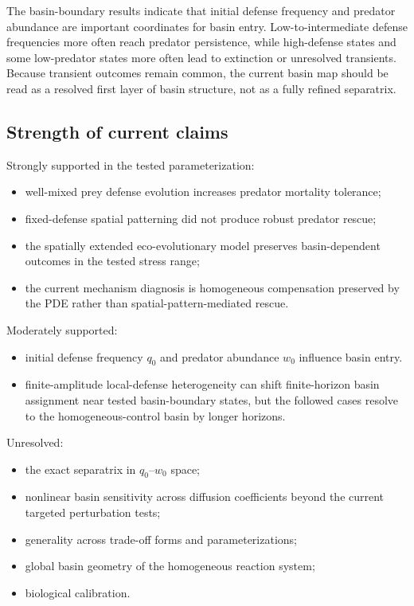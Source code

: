 \documentclass[11pt]{article}
\begin{document}
The basin-boundary results indicate that initial defense frequency and predator abundance are important coordinates for basin entry. Low-to-intermediate defense frequencies more often reach predator persistence, while high-defense states and some low-predator states more often lead to extinction or unresolved transients. Because transient outcomes remain common, the current basin map should be read as a resolved first layer of basin structure, not as a fully refined separatrix.

\subsection{Strength of current claims}

Strongly supported in the tested parameterization:
\begin{itemize}
  \item well-mixed prey defense evolution increases predator mortality tolerance;
  \item fixed-defense spatial patterning did not produce robust predator rescue;
  \item the spatially extended eco-evolutionary model preserves basin-dependent outcomes in the tested stress range;
  \item the current mechanism diagnosis is homogeneous compensation preserved by the PDE rather than spatial-pattern-mediated rescue.
\end{itemize}

Moderately supported:
\begin{itemize}
  \item initial defense frequency \(q_0\) and predator abundance \(w_0\) influence basin entry.
  \item finite-amplitude local-defense heterogeneity can shift finite-horizon basin assignment near tested basin-boundary states, but the followed cases resolve to the homogeneous-control basin by longer horizons.
\end{itemize}

Unresolved:
\begin{itemize}
  \item the exact separatrix in \(q_0\)--\(w_0\) space;
  \item nonlinear basin sensitivity across diffusion coefficients beyond the current targeted perturbation tests;
  \item generality across trade-off forms and parameterizations;
  \item global basin geometry of the homogeneous reaction system;
  \item biological calibration.
\end{itemize}
\end{document}
